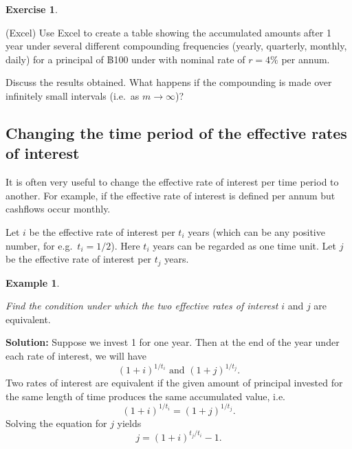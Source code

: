 \documentclass[
]{book}
\theoremstyle{definition}
\theoremstyle{definition}
\newtheorem{example}{Example}[chapter]
\theoremstyle{definition}
\newtheorem{exercise}{Exercise}[chapter]
\theoremstyle{definition}
\theoremstyle{remark}
\begin{document}
\begin{exercise}
\protect\hypertarget{exr:unlabeled-div-16}{}\label{exr:unlabeled-div-16}

(Excel) Use Excel to create a table showing the accumulated amounts after 1 year under several different compounding frequencies (yearly, quarterly, monthly, daily) for a principal of ฿100 under with nominal rate of \(r = 4\%\) per annum.

Discuss the results obtained. What happens if the compounding is made over infinitely small intervals (i.e.~as \(m \rightarrow \infty\))?

\end{exercise}

\hypertarget{changing-the-time-period-of-the-effective-rates-of-interest}{%
\subsection{Changing the time period of the effective rates of interest}\label{changing-the-time-period-of-the-effective-rates-of-interest}}

It is often very useful to change the effective rate of interest per
time period to another. For example, if the effective rate of interest
is defined per annum but cashflows occur monthly.

Let \(i\) be the effective rate of interest per \(t_i\) years (which can be
any positive number, for e.g.~\(t_i = 1/2\)). Here \(t_i\) years can be
regarded as one time unit. Let \(j\) be the effective rate of interest per
\(t_j\) years.

\begin{example}
\protect\hypertarget{exm:unlabeled-div-17}{}\label{exm:unlabeled-div-17}

\emph{Find the condition under which the two effective rates of interest} \(i\)
and \(j\) are equivalent.

\end{example}

\textbf{Solution:} Suppose we invest 1 for one year. Then at the end of the
year under each rate of interest, we will have
\[(1+i)^{1/t_i} \text{ and } (1+j)^{1/t_j}.\] Two rates of interest are
equivalent if the given amount of principal invested for the same length
of time produces the same accumulated value, i.e.
\[(1+i)^{1/t_i} = (1+j)^{1/t_j}.\] Solving the equation for \(j\) yields
\[j = (1+i)^{t_j/t_i} - 1.\]
\end{document}

